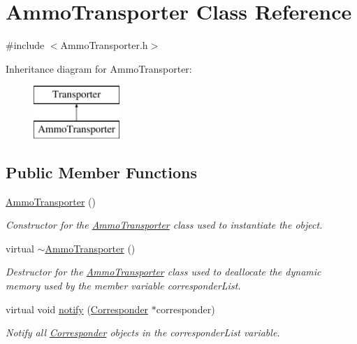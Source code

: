 \hypertarget{class_ammo_transporter}{}\section{Ammo\+Transporter Class Reference}
\label{class_ammo_transporter}


{\ttfamily \#include $<$Ammo\+Transporter.\+h$>$}

Inheritance diagram for Ammo\+Transporter\+:\begin{figure}[H]
\begin{center}
\leavevmode
\includegraphics[height=2.000000cm]{class_ammo_transporter}
\end{center}
\end{figure}
\subsection*{Public Member Functions}
\begin{DoxyCompactItemize}
\item 
\mbox{\hyperlink{class_ammo_transporter_a52f3a89dca9316f6b6fcc2ebb4be421b}{Ammo\+Transporter}} ()
\begin{DoxyCompactList}\small\item\em Constructor for the \mbox{\hyperlink{class_ammo_transporter}{Ammo\+Transporter}} class used to instantiate the object. \end{DoxyCompactList}\item 
virtual \mbox{\hyperlink{class_ammo_transporter_a2b4f1d8d346219cf172f839d19995bb3}{$\sim$\+Ammo\+Transporter}} ()
\begin{DoxyCompactList}\small\item\em Destructor for the \mbox{\hyperlink{class_ammo_transporter}{Ammo\+Transporter}} class used to deallocate the dynamic memory used by the member variable corresponder\+List. \end{DoxyCompactList}\item 
virtual void \mbox{\hyperlink{class_ammo_transporter_a2f29d78a7be5b6116b7299494fef2b7e}{notify}} (\mbox{\hyperlink{class_corresponder}{Corresponder}} $\ast$corresponder)
\begin{DoxyCompactList}\small\item\em Notify all \mbox{\hyperlink{class_corresponder}{Corresponder}} objects in the corresponder\+List variable. \end{DoxyCompactList}\end{DoxyCompactItemize}
